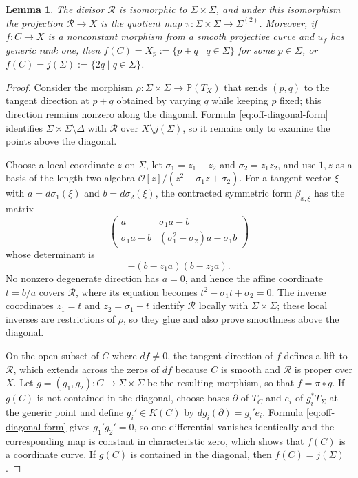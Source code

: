 \documentclass[oneside,11pt]{amsart}
\newtheorem{lem}[thm]{Lemma}
\theoremstyle{definition}
\theoremstyle{remark}
\numberwithin{thm}{section}
\numberwithin{equation}{section}
\begin{document}
\begin{lem}\label{lem:root-divisor}
The divisor $\mathscr{R}$ is isomorphic to $\Sigma\times\Sigma$, and under this isomorphism the projection $\mathscr{R}\to X$ is the quotient map $\pi:\Sigma\times\Sigma\to\Sigma^{(2)}$.  Moreover, if $f: C\to X$ is a nonconstant morphism from a smooth projective curve and $u_f$ has generic rank one, then $f(C)=X_p:=\{p+q \mid q\in\Sigma\}$ for some $p\in\Sigma$, or $f(C)=j(\Sigma):=\{2q \mid q\in\Sigma\}$.
\end{lem}

\begin{proof}
Consider the morphism
$\rho:\Sigma\times\Sigma\longrightarrow\mathbb{P}(T_X)$ that sends $(p,q)$ to the tangent direction at $p+q$ obtained by varying $q$ while keeping $p$ fixed; this direction remains nonzero along the diagonal.  Formula \eqref{eq:off-diagonal-form} identifies $\Sigma\times\Sigma\setminus\Delta$ with $\mathscr{R}$ over $X\setminus j(\Sigma)$, so it remains only to examine the points above the diagonal.

Choose a local coordinate $z$ on $\Sigma$, let $\sigma_1=z_1+z_2$ and $\sigma_2=z_1z_2$, and use $1,z$ as a basis of the length two algebra $\mathcal{O}[z]/(z^2-\sigma_1z+\sigma_2)$.  For a tangent vector $\xi$ with $a=d\sigma_1(\xi)$ and $b=d\sigma_2(\xi)$, the contracted
symmetric form $\beta_{x,\xi}$ has the matrix
\[
 \begin{pmatrix}
 a&\sigma_1a-b\\
 \sigma_1a-b&(\sigma_1^2-\sigma_2)a-\sigma_1b
 \end{pmatrix}
\]
whose determinant is
\[
 -(b-z_1a)(b-z_2a).
\]
No nonzero degenerate direction has $a=0$, and hence the affine coordinate $t=b/a$ covers $\mathscr{R}$, where its equation becomes $t^2-\sigma_1t+\sigma_2=0$.  The inverse coordinates $z_1=t$ and $z_2=\sigma_1-t$ identify $\mathscr{R}$ locally with
$\Sigma\times\Sigma$; these local inverses are restrictions of $\rho$, so they glue and also prove smoothness above the diagonal.

On the open subset of $C$ where $df\neq0$, the tangent direction of $f$ defines a lift to $\mathscr{R}$, which extends across the zeros of $df$ because $C$ is smooth and $\mathscr{R}$ is proper over $X$.  Let $g=(g_1,g_2):C\to\Sigma\times\Sigma$ be the resulting morphism, so that $f=\pi\circ g$.  If $g(C)$ is not contained in the diagonal, choose bases $\partial$ of $T_C$ and $e_i$ of $g_i^*T_\Sigma$ at the generic point and
define $g_i'\in K(C)$ by $dg_i(\partial)=g_i'e_i$.  Formula
\eqref{eq:off-diagonal-form} gives $g_1'g_2'=0$, so one differential vanishes identically and the corresponding map is constant in characteristic zero, which shows that $f(C)$ is a coordinate curve.  If $g(C)$ is contained in the diagonal, then $f(C)=j(\Sigma)$.
\end{proof}
\end{document}

